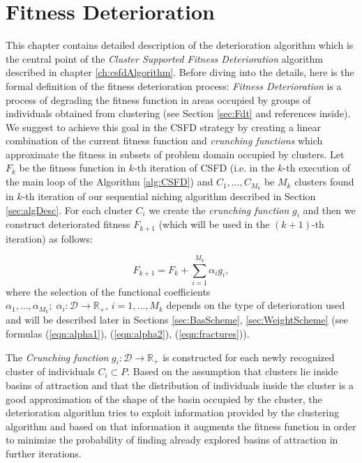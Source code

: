 

\chapter{Fitness Deterioration}
\label{ch:fitnessDet}

This chapter contains detailed description of the deterioration algorithm
which is the central point of the \textit{Cluster Supported Fitness
Deterioration} algorithm described in chapter \ref{ch:csfdAlgorithm}. 
Before diving into the details, here is the formal definition of the fitness
deterioration process:
\textit{Fitness Deterioration} is a process of degrading the fitness
function in areas occupied by groups of individuals obtained from
clustering (see Section \ref{sec:Fdt} and references inside). 
We suggest to achieve this goal in the CSFD strategy by creating a linear combination 
of the current fitness function and \textit{crunching functions} which approximate
the fitness in subsets of problem domain occupied by clusters.
Let $F_k$ be the fitness function in $k$-th iteration of CSFD
(i.e. in the $k$-th execution of the main loop of the Algorithm \ref{alg:CSFD})
and $C_1, \ldots, C_{M_k}$ be
$M_k$ clusters found in $k$-th iteration of our sequential niching algorithm 
described in Section \ref{sec:algDesc}.
For each cluster $C_i$ we create the \textit{crunching function} $g_i$ and then
we construct deteriorated fitness $F_{k+1}$ (which will be used in the
$(k+1)$-th iteration) as follows:

\begin{equation}
\label{eqn:fitDet}
F_{k+1} = F_k + \sum_{i=1}^{M_k} \alpha_i g_i,
\end{equation}
where the selection of the functional coefficients 
$\alpha_1, \ldots, \alpha_{M_k}; \; \alpha_i:\mathcal{D} \rightarrow \mathbb{R}_+, \,
i = 1, \ldots, M_k$ depends on the
type of deterioration used and will be described later in Sections
\ref{sec:BasScheme}, \ref{sec:WeightScheme}
(see formulas (\ref{eqn:alpha1}), (\ref{eqn:alpha2}), 
(\ref{eqn:fractures})).
 

The \textit{Crunching function} $g_i: \mathcal{D} \rightarrow \mathbb{R}_+$ 
is constructed for each newly recognized cluster of individuals
$C_i \subset P$.
Based on the assumption that clusters lie inside basins
of attraction and that the distribution of individuals inside the cluster
is a good approximation of the shape of the basin occupied by the cluster,
the deterioration algorithm tries to exploit information
provided by the clustering algorithm and based 
on that information it augments the fitness function in order to minimize 
the probability of finding already explored basins of attraction in further iterations.

